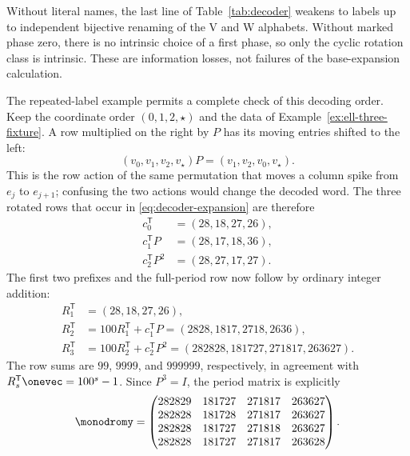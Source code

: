 \documentclass[11pt,letterpaper]{article}
\theoremstyle{definition}
\theoremstyle{remark}
\numberwithin{equation}{section}
\begin{document}
Without literal names, the last line of Table~\ref{tab:decoder} weakens to
labels up to independent bijective renaming of the V and W alphabets.
Without marked phase zero, there is no intrinsic choice of a first phase, so
only the cyclic rotation class is intrinsic.  These are information losses,
not failures of the base-expansion calculation.

The repeated-label example permits a complete check of this decoding order.
Keep the coordinate order \((0,1,2,\star)\) and the data of
Example~\ref{ex:ell-three-fixture}.  A row multiplied on the right by \(P\)
has its moving entries shifted to the left:
\[
 (v_0,v_1,v_2,v_\star)P=(v_1,v_2,v_0,v_\star).
\]
This is the row action of the same permutation that moves a column spike
from \(e_j\) to \(e_{j+1}\); confusing the two actions would change the
decoded word.  The three rotated rows that occur in
\eqref{eq:decoder-expansion} are therefore
\begin{equation}
 \begin{aligned}
 c_0^{\mathsf T}&=(28,18,27,26),\\
 c_1^{\mathsf T}P&=(28,17,18,36),\\
 c_2^{\mathsf T}P^2&=(28,27,17,27).
 \end{aligned}
 \label{eq:fixture-rotated-digits}
\end{equation}
The first two prefixes and the full-period row now follow by ordinary
integer addition:
\begin{equation}
 \begin{aligned}
 R_1^{\mathsf T}&=(28,18,27,26),\\
 R_2^{\mathsf T}
   &=100R_1^{\mathsf T}+c_1^{\mathsf T}P
     =(2828,1817,2718,2636),\\
 R_3^{\mathsf T}
   &=100R_2^{\mathsf T}+c_2^{\mathsf T}P^2
     =(282828,181727,271817,263627).
 \end{aligned}
 \label{eq:fixture-prefix-rows}
\end{equation}
The row sums are \(99\), \(9999\), and \(999999\), respectively, in
agreement with \(R_s^{\mathsf T}\onevec=100^s-1\).
Since \(P^3=I\), the period matrix is explicitly
\begin{equation}
 \monodromy=
 \begin{pmatrix}
 282829&181727&271817&263627\\
 282828&181728&271817&263627\\
 282828&181727&271818&263627\\
 282828&181727&271817&263628
 \end{pmatrix}.
 \label{eq:fixture-period-matrix}
\end{equation}
\end{document}
